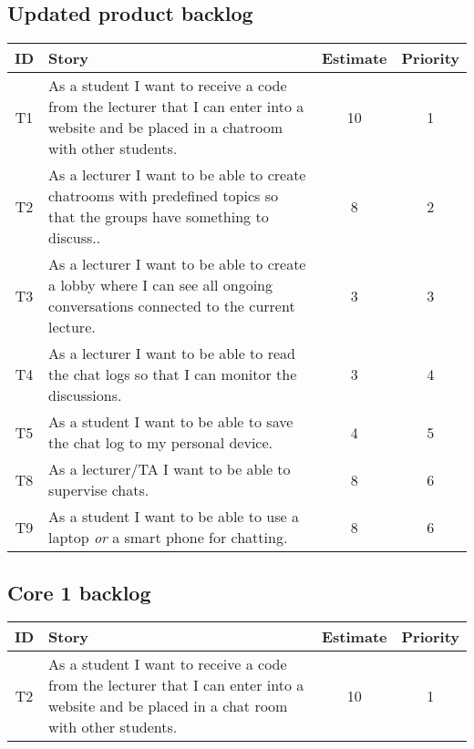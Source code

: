 \subsection{Updated product backlog}
\label{sec:Updated backlog}
\begin{tabular}{ c | p{} | c | c}
     ID & Story & Estimate & Priority \\ \hline
     T1
     &  As a student I want to receive a code from the lecturer that I can enter into a website and be placed in a chatroom with other students. 
     & 10 & 1 \\ \hline
     T2
     &  As a lecturer I want to be able to create chatrooms with predefined topics so that the groups have something to discuss.. 
     & 8 & 2 \\ \hline
     T3
     &  As a lecturer I want to be able to create a lobby where I can see all ongoing conversations connected to the current lecture. 
     & 3 & 3 \\ \hline
     T4
     &  As a lecturer I want to be able to read the chat logs so that I can monitor the discussions.
     & 3 & 4 \\ \hline
     T5
     &  As a student I want to be able to save the chat log to my personal device. 
     & 4 & 5 \\ \hline
     T8
     & As a lecturer/TA I want to be able to supervise chats.
     & 8 & 6 \\ \hline
     T9
     & As a student I want to be able to use a laptop \textit{or} a smart phone for chatting.
     & 8 & 6 \\ \hline
\end{tabular}

\subsection{Core 1 backlog}
\begin{tabular}{ c | p{} | c | c}
     ID & Story & Estimate & Priority \\ \hline
     T2
     & As a student I want to receive a code from the lecturer that I can enter into a website and be placed in a chat room with other students. 
     & 10 & 1 \\ \hline
\end{tabular}


